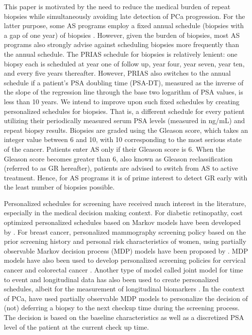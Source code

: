 This paper is motivated by the need to reduce the medical burden of repeat biopsies while simultaneously avoiding late detection of PCa progression. For the latter purpose, some AS programs employ a fixed annual schedule (biopsies with a gap of one year) of biopsies \citep{tosoian2011active,welty2015extended}. However, given the burden of biopsies, most AS programs also strongly advise against scheduling biopsies more frequently than the annual schedule. The PRIAS schedule for biopsies is relatively lenient: one biopsy each is scheduled at year one of follow up, year four, year seven, year ten, and every five years thereafter. However, PRIAS also switches to the annual schedule if a patient's PSA doubling time (PSA-DT), measured as the inverse of the slope of the regression line through the base two logarithm of PSA values, is less than 10 years. We intend to improve upon such fixed schedules by creating personalized schedules for biopsies. That is, a different schedule for every patient utilizing their periodically measured serum PSA levels (measured in ng/mL) and repeat biopsy results. Biopsies are graded using the Gleason score, which takes an integer value between 6 and 10, with 10 corresponding to the most serious state of the cancer. Patients enter AS only if their Gleason score is 6. When the Gleason score becomes greater than 6, also known as Gleason reclassification (referred to as GR hereafter), patients are advised to switch from AS to active treatment. Hence, for AS programs it is of prime interest to detect GR early with the least number of biopsies possible.

Personalized schedules for screening have received much interest in the literature, especially in the medical decision making context. For diabetic retinopathy, cost optimized personalized schedules based on Markov models have been developed by \citet{bebu2017OptimalScreening}. For breast cancer, personalized mammography screening policy based on the prior screening history and personal risk characteristics of women, using partially observable Markov decision process (MDP) models have been proposed by \citet*{ayer2012or}. MDP models have also been used to develop personalized screening policies for cervical cancer \citep*{akhavan2017markov} and colorectal cancer \citep*{erenay2014optimizing}. Another type of model called joint model for time to event and longitudinal data \citep{tsiatis2004joint,rizopoulos2012joint} has also been used to create personalized schedules, albeit for the measurement of longitudinal biomarkers \citep{drizopoulosPersScreening}. In the context of PCa, \citet{zhang2012optimization} have used partially observable MDP models to personalize the decision of (not) deferring a biopsy to the next checkup time during the screening process. The decision is based on the baseline characteristics as well as a discretized PSA level of the patient at the current check up time.

